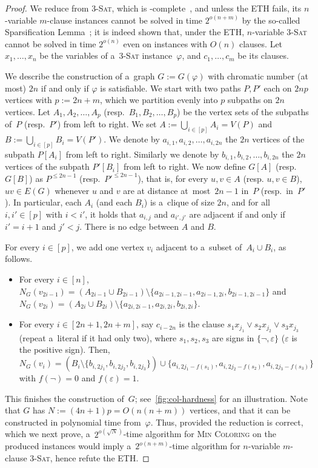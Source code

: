 \documentclass[a4paper,USenglish,cleveref,hyperref,autoref]{lipics-v2021}
\newcommand{\chr}{\textsc{Min Coloring}\xspace}
\renewcommand{\leq}{\leqslant}
\begin{document}
\begin{proof}
  We reduce from \textsc{3-Sat}, which is \NP-complete~\cite{Karp72}, and unless the ETH fails, its $n$-variable $m$-clause instances cannot be solved in time $2^{o(n+m)}$ by the so-called Sparsification Lemma~\cite{sparsification}; it is indeed shown that, under the ETH, $n$-variable \textsc{3-Sat} cannot be solved in time $2^{o(n)}$ even on instances with $O(n)$ clauses. 
  Let $x_1, \ldots, x_n$ be the variables of a~\textsc{3-Sat} instance~$\varphi$, and $c_1, \ldots, c_m$ be its clauses.

  We describe the construction of a~graph $G := G(\varphi)$ with chromatic number (at most) $2n$ if and only if $\varphi$ is satisfiable.
  We start with two paths $P, P'$ each on $2np$ vertices with $p := 2n+m$, which we partition evenly into $p$ subpaths on $2n$ vertices.
  Let $A_1, A_2, \ldots, A_p$ (resp.~$B_1, B_2, \ldots, B_p$) be the vertex sets of the subpaths of~$P$ (resp.~$P'$) from left to right.
  We set $A := \bigcup_{i \in [p]} A_i = V(P)$ and $B := \bigcup_{i \in [p]} B_i = V(P')$.
  We denote by $a_{i,1}, a_{i,2}, \ldots, a_{i,2n}$ the $2n$ vertices of the subpath $P[A_i]$ from left to right.
  Similarly we denote by $b_{i,1}, b_{i,2}, \ldots, b_{i,2n}$ the $2n$ vertices of the subpath $P'[B_i]$ from left to right.
  We now define $G[A]$ (resp.~$G[B]$) as $P^{\leq 2n-1}$ (resp.~$P'^{\leq 2n-1}$), that is, for every $u,v \in A$ (resp. $u,v \in B$), $uv \in E(G)$ whenever $u$ and $v$ are at distance at~most~$2n-1$ in~$P$ (resp.~in~$P'$).
  In particular, each $A_i$ (and each $B_i$) is a~clique of size $2n$, and for all $i,i' \in [p]$ with $i < i'$, it holds that $a_{i,j}$ and $a_{i',j'}$ are adjacent if and only if $i' = i+1$ and $j' < j$.    
  There is no edge between $A$ and $B$.

  For every $i \in [p]$, we add one vertex $v_i$ adjacent to a~subset of~$A_i \cup B_i$, as follows.
  \begin{itemize}
  \item For every $i \in [n]$, $N_G(v_{2i-1}) = (A_{2i-1} \cup B_{2i-1}) \setminus \{a_{2i-1,2i-1}, a_{2i-1,2i}, b_{2i-1,2i-1}\}$ and $N_G(v_{2i})=(A_{2i} \cup B_{2i}) \setminus \{a_{2i,2i-1}, a_{2i,2i}, b_{2i,2i}\}$.
  \item For every $i \in [2n+1,2n+m]$, say $c_{i-2n}$ is the clause $s_1 x_{j_1} \lor s_2 x_{j_2} \lor s_3 x_{j_3}$ (repeat a~literal if it had only two), where $s_1, s_2, s_3$ are signs in $\{\neg,\varepsilon\}$ ($\varepsilon$ is the positive sign).
   Then, $N_G(v_i)=(B_i \setminus \{b_{i, 2j_1}, b_{i, 2j_2}, b_{i, 2j_3}\}) \cup \{a_{i, 2j_1-f(s_1)}, a_{i, 2j_2-f(s_2)}, a_{i, 2j_3-f(s_3)}\}$ with $f(\neg)=0$ and $f(\varepsilon)=1$.
  \end{itemize}
  \medskip
  This finishes the construction of~$G$; see~\cref{fig:col-hardness} for an illustration.
  Note that $G$ has $N:=(4n+1)p=O(n(n+m))$ vertices, and that it can be constructed in polynomial time from~$\varphi$.
  Thus, provided the reduction is correct, which we next prove, a~$2^{o(\sqrt{N})}$-time algorithm for \chr on the produced instances would imply a~$2^{o(n+m)}$-time algorithm for $n$-variable $m$-clause \textsc{3-Sat}, hence refute the ETH.
  

\end{proof}
\end{document}
